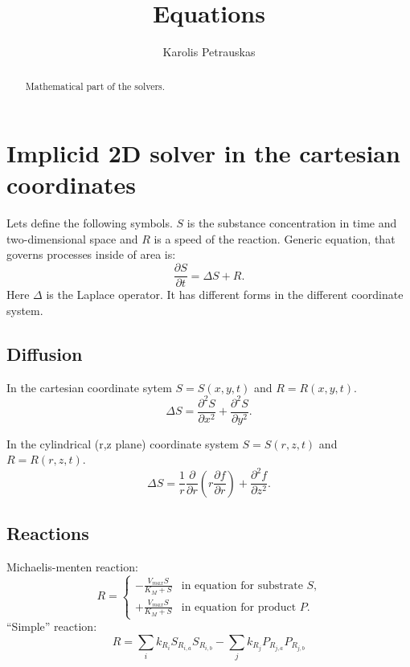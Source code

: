 \documentclass[a4paper,10pt]{article}
\title{Equations}
\author{Karolis Petrauskas}
\begin{document}
\maketitle
\begin{abstract}
    Mathematical part of the solvers.
\end{abstract}

\section{Implicid 2D solver in the cartesian coordinates}
Lets define the following symbols.
$S$ is the substance concentration in time and two-dimensional space and
$R$ is a speed of the reaction.
Generic equation, that governs processes inside of area is:
\begin{equation}
    \frac{\partial S}{\partial t} = \Delta S + R.
\end{equation}
Here $\Delta$ is the Laplace operator. It has different forms in the different coordinate system.

\subsection{Diffusion}

In the cartesian coordinate sytem $S = S(x, y, t)$ and $R = R(x, y, t)$.
\begin{equation}
    \Delta S = \frac{\partial^2 S}{\partial x^2} + \frac{\partial^2 S}{\partial y^2}.
\end{equation}


In the cylindrical (r,z plane) coordinate system $S = S(r, z, t)$ and $R = R(r, z, t)$.
\begin{equation}
    \Delta S =
        \frac{1}{r} \frac{\partial}{\partial r}
        \left( r \frac{\partial f}{\partial r} \right) +
        \frac{\partial^2 f}{\partial z^2}.
\end{equation}

\subsection{Reactions}

Michaelis-menten reaction:
\begin{equation}
    R = \begin{cases}
            -\frac{V_{max} S}{K_M + S} & \text{in equation for substrate $S$,}
            \\
            +\frac{V_{max} S}{K_M + S} & \text{in equation for product $P$.}
        \end{cases}
\end{equation}
%
``Simple'' reaction:
\begin{equation}
    R = \sum_i k_{R_i} S_{R_{i,a}} S_{R_{i,b}} - \sum_j k_{R_j} P_{R_{j,a}} P_{R_{j,b}}
\end{equation}
\end{document}
